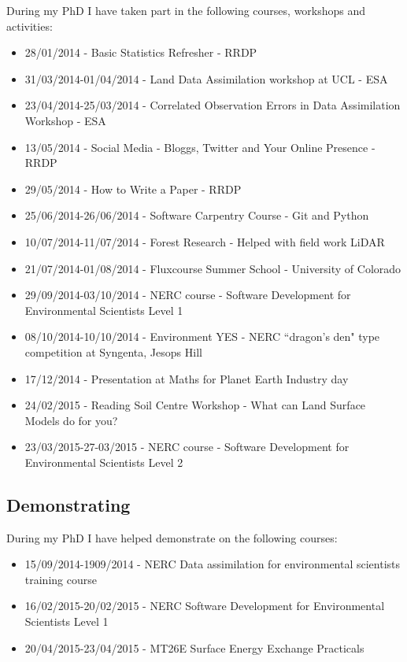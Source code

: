 \documentclass[11pt]{article}
\begin{document}
During my PhD I have taken part in the following courses, workshops and activities:
\begin{itemize}
\item 28/01/2014 - Basic Statistics Refresher - RRDP

\item 31/03/2014-01/04/2014 - Land Data Assimilation workshop at UCL - ESA

\item 23/04/2014-25/03/2014 - Correlated Observation Errors in Data Assimilation Workshop - ESA

\item 13/05/2014 - Social Media - Bloggs, Twitter and Your Online Presence - RRDP

\item 29/05/2014 - How to Write a Paper - RRDP

\item 25/06/2014-26/06/2014 - Software Carpentry Course - Git and Python

\item 10/07/2014-11/07/2014 - Forest Research - Helped with field work LiDAR

\item  21/07/2014-01/08/2014 - Fluxcourse Summer School - University of Colorado

\item 29/09/2014-03/10/2014 - NERC course - Software Development for Environmental Scientists Level 1

\item 08/10/2014-10/10/2014 - Environment YES - NERC ``dragon's den" type competition at Syngenta, Jesops Hill

\item 17/12/2014 - Presentation at Maths for Planet Earth Industry day

\item 24/02/2015 - Reading Soil Centre Workshop - What can Land Surface Models do for you?

\item 23/03/2015-27-03/2015 - NERC course - Software Development for Environmental Scientists Level 2
\end{itemize}

\subsection{Demonstrating}
During my PhD I have helped demonstrate on the following courses:
\begin{itemize}
\item 15/09/2014-1909/2014 - NERC Data assimilation for environmental scientists training course

\item 16/02/2015-20/02/2015 - NERC Software Development for Environmental Scientists Level 1

\item 20/04/2015-23/04/2015 - MT26E Surface Energy Exchange Practicals
\end{itemize}


{}
%
\end{document}
